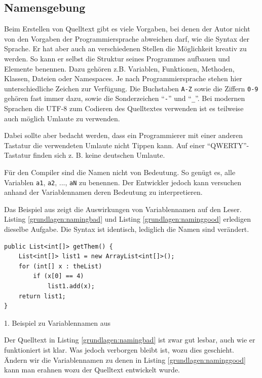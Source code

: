 \subsection{Namensgebung}
\label{grundlagen:namensgebung}

Beim Erstellen von Quelltext gibt es viele Vorgaben, bei denen der Autor nicht von den Vorgaben der Programmiersprache abweichen darf, wie die Syntax der Sprache.
Er hat aber auch an verschiedenen Stellen die Möglichkeit kreativ zu werden. So kann er selbst die Struktur seines Programmes aufbauen und Elemente benennen.
Dazu gehören z.B. Variablen, Funktionen, Methoden, Klassen, Dateien oder Namespaces.
Je nach Programmiersprache stehen hier unterschiedliche Zeichen zur Verfügung.
Die Buchstaben \texttt{A-Z} sowie die Ziffern \texttt{0-9} gehören fast immer dazu, sowie die
Sonderzeichen \enquote{\texttt{-}} und \enquote{\texttt{\_}}. Bei modernen Sprachen die UTF-8
zum Codieren des Quelltextes verwenden ist es teilweise auch möglich Umlaute zu verwenden.

Dabei sollte aber bedacht werden, dass ein Programmierer mit einer anderen
Tastatur die verwendeten Umlaute nicht Tippen kann. Auf einer \enquote{QWERTY}-Tastatur finden sich z. B. keine deutschen Umlaute.

Für den Compiler sind die Namen nicht von Bedeutung. So genügt es, alle Variablen \texttt{a1},
\texttt{a2}, ..., \texttt{aN} zu benennen. Der Entwickler jedoch kann versuchen anhand der  Variablennamen deren Bedeutung zu  interpretieren.

Das Beispiel aus \cite[S. 46-47]{Martin} zeigt die Auswirkungen von Variablennamen auf den Leser. Listing \ref{grundlagen:namingbad} und Listing \ref{grundlagen:naminggood} erledigen dieselbe Aufgabe. Die Syntax ist identisch, lediglich die Namen sind verändert.

\begin{listing}
    \begin{verbatim}
public List<int[]> getThem() {
    List<int[]> list1 = new ArrayList<int[]>();
    for (int[] x : theList)
        if (x[0] == 4)
            list1.add(x);
    return list1;
}
    \end{verbatim}
    \caption{1. Beispiel zu Variablennamen aus \cite[S. 46]{Martin}}
    \label{grundlagen:namingbad}
\end{listing}

Der Quelltext in Listing \ref{grundlagen:namingbad} ist zwar gut lesbar, auch wie er funktioniert ist klar. Was jedoch verborgen bleibt ist, wozu dies geschieht. 
Ändern wir die Variablennamen zu denen in Listing \ref{grundlagen:naminggood} kann man erahnen wozu der Quelltext entwickelt wurde.

